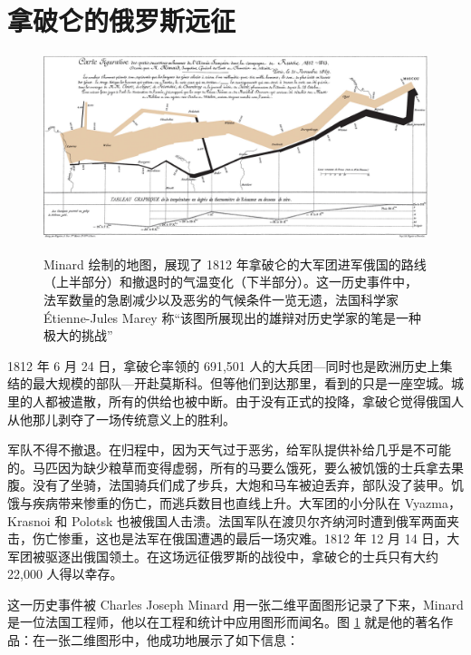 \documentclass[
  b5paper,
  UTF8,twoside]{book}
\begin{document}
\hypertarget{sec:charles-joseph-minard}{%
\section{拿破仑的俄罗斯远征}\label{sec:charles-joseph-minard}}



\begin{figure}

{\centering \href{https://en.wikipedia.org/wiki/Charles_Joseph_Minard}{\includegraphics{images/Minard} }

}

\caption[Charles Joseph Minard 的拿破仑远征图 ]{Minard 绘制的地图，展现了 1812 年拿破仑的大军团进军俄国的路线（上半部分）和撤退时的气温变化（下半部分）。这一历史事件中，法军数量的急剧减少以及恶劣的气候条件一览无遗，法国科学家 Étienne-Jules Marey 称``该图所展现出的雄辩对历史学家的笔是一种极大的挑战''}\label{fig:minard}
\end{figure}

1812 年 6 月 24 日，拿破仑率领的 691,501 人的大兵团---同时也是欧洲历史上集结的最大规模的部队---开赴莫斯科。但等他们到达那里，看到的只是一座空城。城里的人都被遣散，所有的供给也被中断。由于没有正式的投降，拿破仑觉得俄国人从他那儿剥夺了一场传统意义上的胜利。

军队不得不撤退。在归程中，因为天气过于恶劣，给军队提供补给几乎是不可能的。马匹因为缺少粮草而变得虚弱，所有的马要么饿死，要么被饥饿的士兵拿去果腹。没有了坐骑，法国骑兵们成了步兵，大炮和马车被迫丢弃，部队没了装甲。饥饿与疾病带来惨重的伤亡，而逃兵数目也直线上升。大军团的小分队在 Vyazma，Krasnoi 和 Polotsk 也被俄国人击溃。法国军队在渡贝尔齐纳河时遭到俄军两面夹击，伤亡惨重，这也是法军在俄国遭遇的最后一场灾难。1812 年 12 月 14 日，大军团被驱逐出俄国领土。在这场远征俄罗斯的战役中，拿破仑的士兵只有大约 22,000 人得以幸存。

这一历史事件被 Charles Joseph Minard 用一张二维平面图形记录了下来，Minard 是一位法国工程师，他以在工程和统计中应用图形而闻名。图 \ref{fig:minard} 就是他的著名作品：在一张二维图形中，他成功地展示了如下信息：
\end{document}
